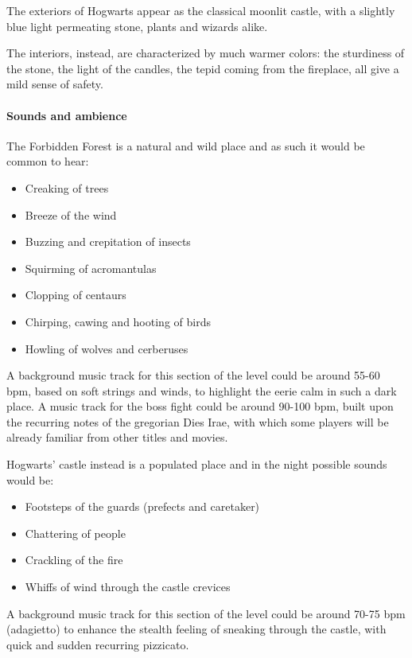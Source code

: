 The exteriors of Hogwarts appear as the classical moonlit castle, with a slightly blue light permeating stone, plants and wizards alike.

The interiors, instead, are characterized by much warmer colors: the sturdiness of the stone, the light of the candles, the tepid coming from the fireplace, all give a mild sense of safety.

\clearpage

\paragraph{Sounds and ambience}

The Forbidden Forest is a natural and wild place and as such it would be common to hear:
\begin{itemize}
	\item Creaking of trees
	\item Breeze of the wind
	\item Buzzing and crepitation of insects
	\item Squirming of acromantulas
	\item Clopping of centaurs 
	\item Chirping, cawing and hooting of birds
	\item Howling of wolves and cerberuses
\end{itemize}
A background music track for this section of the level could be around 55-60 bpm, based on soft strings and winds, to highlight the eerie calm in such a dark place.
A music track for the boss fight could be around 90-100 bpm, built upon the recurring notes of the gregorian Dies Irae, with which some players will be already familiar from other titles and movies.

Hogwarts' castle instead is a populated place and in the night possible sounds would be:
\begin{itemize}
	\item Footsteps of the guards (prefects and caretaker)
	\item Chattering of people
	\item Crackling of the fire
	\item Whiffs of wind through the castle crevices
\end{itemize}
A background music track for this section of the level could be around 70-75 bpm (adagietto) to enhance the stealth feeling of sneaking through the castle, with quick and sudden recurring pizzicato.

\clearpage